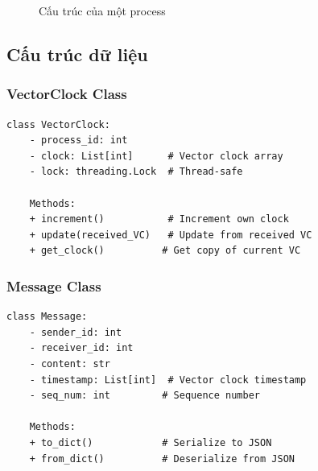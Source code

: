\begin{figure}[h]
\centering
{}
\caption{Cấu trúc của một process}
\end{figure}

\subsection{Cấu trúc dữ liệu}

\subsubsection{VectorClock Class}
\begin{listing}[H]
\begin{verbatim}
class VectorClock:
    - process_id: int
    - clock: List[int]      # Vector clock array
    - lock: threading.Lock  # Thread-safe
    
    Methods:
    + increment()           # Increment own clock
    + update(received_VC)   # Update from received VC
    + get_clock()          # Get copy of current VC
\end{verbatim}
\caption{Vector Clock Structure}
\end{listing}

\subsubsection{Message Class}
\begin{listing}[H]
\begin{verbatim}
class Message:
    - sender_id: int
    - receiver_id: int
    - content: str
    - timestamp: List[int]  # Vector clock timestamp
    - seq_num: int         # Sequence number
    
    Methods:
    + to_dict()            # Serialize to JSON
    + from_dict()          # Deserialize from JSON
\end{verbatim}
\caption{Message Structure}
\end{listing}

